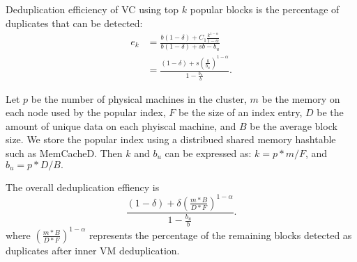 Deduplication efficiency of VC using top $k$ popular blocks
is the percentage of duplicates that can be detected:  
\begin{equation}
\begin{split}
e_k &= 
\frac{ b(1-\delta) + C_1\frac{  k^{1-\alpha}} {1-\alpha}} 
{b(1-\delta)  + sb - b_u }\\
&= 
\frac{ (1-\delta) + s (\frac{k}{b_u})^{1-\alpha}}
{ 1- \frac{b_u}{b} }.
\end{split}
\end{equation}






Let $p$ be the number of physical machines in the cluster, $m$ be the memory on each node used by the popular
index, $F$ be the size of an index entry,
$D$ be the amount of unique data on each phyiscal machine, and 
$B$ be the average block size. We store the popular index using a distribued shared memory hashtable
such as MemCacheD.  Then $k$ and $b_u$ can be expressed as:
$
k = p*m/F$, and $b_u = p*D/B.
$

The overall deduplication effiency is
\[
\frac{ (1-\delta) + \delta (\frac{m*B}{D*F})^{1-\alpha}}
{ 1- \frac{b_u}{b} }.
\]
where $(\frac{m*B}{D*F})^{1-\alpha}$ represents the percentage of the remaining blocks detected as duplicates
after inner VM deduplication. 


